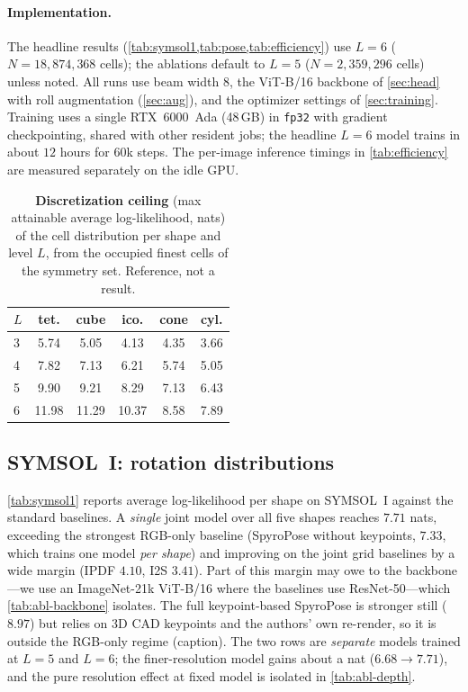 \paragraph{Implementation.}
The headline results (\cref{tab:symsol1,tab:pose,tab:efficiency}) use $L{=}6$
($N=18{,}874{,}368$ cells); the ablations default to $L{=}5$
($N=2{,}359{,}296$ cells) unless noted. All runs use beam width $8$, the ViT-B/16
backbone of \cref{sec:head} with roll augmentation (\cref{sec:aug}), and the
optimizer settings of \cref{sec:training}. Training uses a single RTX~6000~Ada
(48\,GB) in \texttt{fp32} with gradient checkpointing, shared with other resident
jobs; the headline $L{=}6$ model trains in about $12$ hours for $60$k steps. The
per-image inference timings in \cref{tab:efficiency} are measured separately on
the idle GPU.

\begin{table}[t]
\centering
\caption{\textbf{Discretization ceiling} (max attainable average log-likelihood,
nats) of the cell distribution per shape and level $L$, from the occupied finest
cells of the symmetry set. Reference, not a result.}
\label{tab:ceiling}
\small
\begin{tabular}{l ccccc}
\toprule
$L$ & tet. & cube & ico. & cone & cyl. \\
\midrule
3 &  5.74 &  5.05 &  4.13 & 4.35 & 3.66 \\
4 &  7.82 &  7.13 &  6.21 & 5.74 & 5.05 \\
5 &  9.90 &  9.21 &  8.29 & 7.13 & 6.43 \\
6 & 11.98 & 11.29 & 10.37 & 8.58 & 7.89 \\
\bottomrule
\end{tabular}
\end{table}

\subsection{SYMSOL~I: rotation distributions}
\label{sec:symsol1}

\cref{tab:symsol1} reports average log-likelihood per shape on SYMSOL~I against
the standard baselines. A \emph{single} joint model over all five shapes reaches
$7.71$ nats, exceeding the strongest RGB-only baseline (SpyroPose without
keypoints, $7.33$, which trains one model \emph{per shape}) and improving on the
joint grid baselines by a wide margin (IPDF $4.10$, I2S $3.41$). Part of this
margin may owe to the backbone---we use an ImageNet-21k ViT-B/16 where the
baselines use ResNet-50---which \cref{tab:abl-backbone} isolates. The full
keypoint-based SpyroPose is stronger still ($8.97$) but relies on 3D CAD
keypoints and the authors' own re-render, so it is outside the RGB-only regime
(caption). The two \method{} rows are \emph{separate} models trained at $L{=}5$
and $L{=}6$; the finer-resolution model gains about a nat ($6.68\!\to\!7.71$), and
the pure resolution effect at fixed model is isolated in \cref{tab:abl-depth}.


